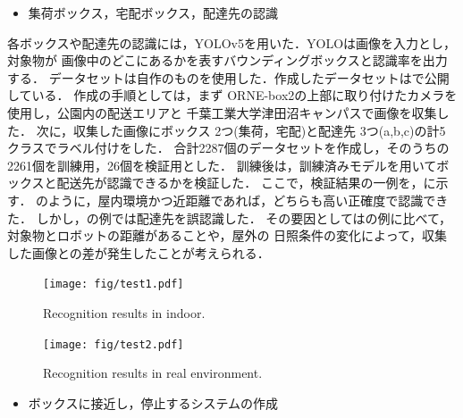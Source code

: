 \documentclass[twocolumn, 9pt]{jsproceedings}
\begin{document}
\begin{itemize}
  \setlength{\leftskip}{-1zw}
  \item 集荷ボックス，宅配ボックス，配達先の認識
\end{itemize}
\vspace*{-2.5mm}

各ボックスや配達先の認識には，YOLOv5\cite{yolo}を用いた．YOLOは画像を入力とし，対象物が
画像中のどこにあるかを表すバウンディングボックスと認識率を出力する．
データセットは自作のものを使用した．作成したデータセットは\cite{nagashima}で公開している．
作成の手順としては，まず ORNE-box2の上部に取り付けたカメラを使用し，公園内の配送エリアと
千葉工業大学津田沼キャンパスで画像を収集した．
次に，収集した画像にボックス 2つ(集荷，宅配)と配達先 3つ(a,b,c)の計5 クラスでラベル付けをした．
合計2287個のデータセットを作成し，そのうちの2261個を訓練用，26個を検証用とした．
訓練後は，訓練済みモデルを用いてボックスと配送先が認識できるかを検証した．
ここで，検証結果の一例を，に示す．
のように，屋内環境かつ近距離であれば，どちらも高い正確度で認識できた．
しかし，の例では配達先を誤認識した．
その要因としてはの例に比べて，対象物とロボットの距離があることや，屋外の
日照条件の変化によって，収集した画像との差が発生したことが考えられる．

\begin{figure}[h!]
  \centering
  \texttt{[image: fig/test1.pdf]}
  \caption{Recognition results in indoor.}
  \label{fig:test1}
\end{figure}

\begin{figure}[h!]
  \centering
  \texttt{[image: fig/test2.pdf]}
  \caption{Recognition results in real environment.}
  \label{fig:test2}
\end{figure}

\begin{itemize}
  \setlength{\leftskip}{-1zw}
  \item ボックスに接近し，停止するシステムの作成
\end{itemize}
\vspace*{-2.5mm}
\end{document}
